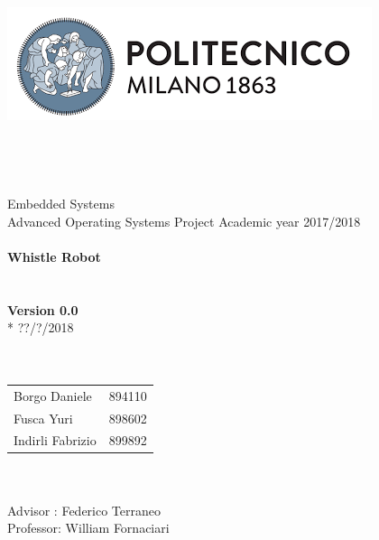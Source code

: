 \begin{titlepage}
	\begin{center}
		\includegraphics[scale=0.5]{files/images/PolimiLogo}
		\ \\ \ \\ \ \\ \ \\ \ \\
		\huge Embedded Systems \\
		\huge Advanced Operating Systems Project
		Academic year 2017/2018
		\ \\ \ \\
		\textbf{Whistle Robot}
		\ \\ \ \\ \ \\
		\textbf{Version 0.0}\\*
		??/?/2018
		\ \\ \ \\ \ \\
		\begin{tabular}{ l c }
			Borgo Daniele & 894110\\
			Fusca Yuri & 898602 \\
			Indirli Fabrizio & 899892 \\
		\end{tabular}
		\ \\ \ \\
		Advisor : Federico Terraneo \\
		Professor: William Fornaciari
	\end{center}
\end{titlepage}